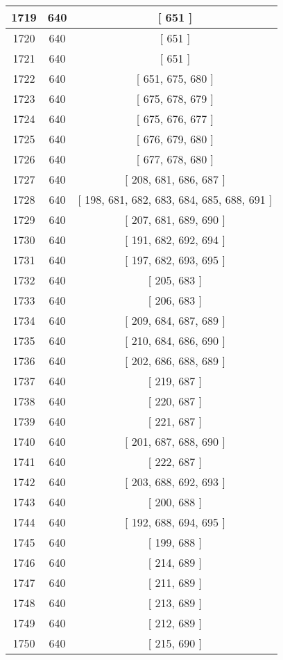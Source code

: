 \begin{center}
\begin{longtable}[H]{|| c c c ||}
1719 & 640 & [ 651 ] \\ 
\hline
1720 & 640 & [ 651 ] \\ 
\hline
1721 & 640 & [ 651 ] \\ 
\hline
1722 & 640 & [ 651, 675, 680 ] \\ 
\hline
1723 & 640 & [ 675, 678, 679 ] \\ 
\hline
1724 & 640 & [ 675, 676, 677 ] \\ 
\hline
1725 & 640 & [ 676, 679, 680 ] \\ 
\hline
1726 & 640 & [ 677, 678, 680 ] \\ 
\hline
1727 & 640 & [ 208, 681, 686, 687 ] \\ 
\hline
1728 & 640 & [ 198, 681, 682, 683, 684, 685, 688, 691 ] \\ 
\hline
1729 & 640 & [ 207, 681, 689, 690 ] \\ 
\hline
1730 & 640 & [ 191, 682, 692, 694 ] \\ 
\hline
1731 & 640 & [ 197, 682, 693, 695 ] \\ 
\hline
1732 & 640 & [ 205, 683 ] \\ 
\hline
1733 & 640 & [ 206, 683 ] \\ 
\hline
1734 & 640 & [ 209, 684, 687, 689 ] \\ 
\hline
1735 & 640 & [ 210, 684, 686, 690 ] \\ 
\hline
1736 & 640 & [ 202, 686, 688, 689 ] \\ 
\hline
1737 & 640 & [ 219, 687 ] \\ 
\hline
1738 & 640 & [ 220, 687 ] \\ 
\hline
1739 & 640 & [ 221, 687 ] \\ 
\hline
1740 & 640 & [ 201, 687, 688, 690 ] \\ 
\hline
1741 & 640 & [ 222, 687 ] \\ 
\hline
1742 & 640 & [ 203, 688, 692, 693 ] \\ 
\hline
1743 & 640 & [ 200, 688 ] \\ 
\hline
1744 & 640 & [ 192, 688, 694, 695 ] \\ 
\hline
1745 & 640 & [ 199, 688 ] \\ 
\hline
1746 & 640 & [ 214, 689 ] \\ 
\hline
1747 & 640 & [ 211, 689 ] \\ 
\hline
1748 & 640 & [ 213, 689 ] \\ 
\hline
1749 & 640 & [ 212, 689 ] \\ 
\hline
1750 & 640 & [ 215, 690 ] \\ 
\hline

\end{longtable}
\end{center}
